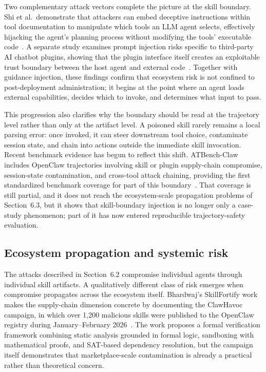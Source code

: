 Two complementary attack vectors complete the picture at the skill boundary. Shi et al.\ demonstrate that attackers can embed deceptive instructions within tool documentation to manipulate which tools an LLM agent selects, effectively hijacking the agent's planning process without modifying the tools' executable code~\cite{ndss2026toolinjection}. A separate study examines prompt injection risks specific to third-party AI chatbot plugins, showing that the plugin interface itself creates an exploitable trust boundary between the host agent and external code~\cite{sp2026plugininjection}. Together with guidance injection, these findings confirm that ecosystem risk is not confined to post-deployment administration; it begins at the point where an agent loads external capabilities, decides which to invoke, and determines what input to pass.

This progression also clarifies why the boundary should be read at the trajectory level rather than only at the artifact level. A poisoned skill rarely remains a local parsing error: once invoked, it can steer downstream tool choice, contaminate session state, and chain into actions outside the immediate skill invocation. Recent benchmark evidence has begun to reflect this shift. ATBench-Claw includes OpenClaw trajectories involving skill or plugin supply-chain compromise, session-state contamination, and cross-tool attack chaining, providing the first standardized benchmark coverage for part of this boundary~\cite{atbenchclaw2026}. That coverage is still partial, and it does not reach the ecosystem-scale propagation problems of Section~6.3, but it shows that skill-boundary injection is no longer only a case-study phenomenon; part of it has now entered reproducible trajectory-safety evaluation.

\subsection{Ecosystem propagation and systemic risk}

The attacks described in Section~6.2 compromise individual agents through individual skill artifacts. A qualitatively different class of risk emerges when compromise propagates across the ecosystem itself. Bhardwaj's SkillFortify work makes the supply-chain dimension concrete by documenting the ClawHavoc campaign, in which over 1,200 malicious skills were published to the OpenClaw registry during January--February 2026~\cite{skillfortify2026}. The work proposes a formal verification framework combining static analysis grounded in formal logic, sandboxing with mathematical proofs, and SAT-based dependency resolution, but the campaign itself demonstrates that marketplace-scale contamination is already a practical rather than theoretical concern.

